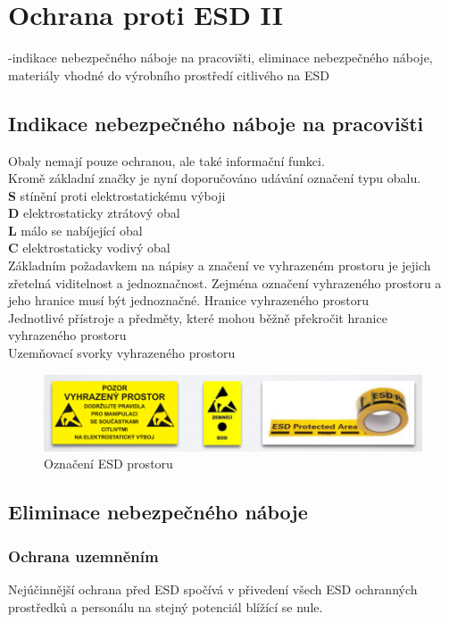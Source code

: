 \section{Ochrana proti ESD II}
-indikace nebezpečného náboje na pracovišti, eliminace
nebezpečného náboje, materiály vhodné do výrobního prostředí citlivého na ESD

\subsection{Indikace nebezpečného náboje na pracovišti}
Obaly nemají pouze ochranou, ale také informační funkci.\\
Kromě základní značky je nyní doporučováno udávání označení typu obalu.\\
\textbf{S} stínění proti elektrostatickému výboji\\
\textbf{D} elektrostaticky ztrátový obal\\
\textbf{L} málo se nabíjející obal\\
\textbf{C} elektrostaticky vodivý obal\\

Základním požadavkem na nápisy a značení ve vyhrazeném prostoru je jejich zřetelná viditelnost a jednoznačnost. Zejména označení vyhrazeného prostoru a jeho hranice musí být jednoznačné.
Hranice vyhrazeného prostoru\\
Jednotlivé přístroje a předměty, které mohou běžně překročit hranice vyhrazeného prostoru\\
Uzemňovací svorky vyhrazeného prostoru\\

\begin{figure}[h]
   \begin{center}
     \includegraphics[scale=0.5]{images/ESD.png}
   \end{center}
   \caption{Označení ESD prostoru}
\end{figure}

\subsection{Eliminace nebezpečného náboje}
\subsubsection{Ochrana uzemněním}
Nejúčinnější ochrana před ESD spočívá v přivedení všech ESD ochranných prostředků
a personálu na stejný potenciál blížící se nule.


